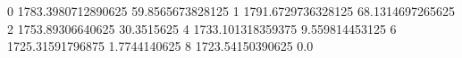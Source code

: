 0 1783.3980712890625 59.8565673828125
1 1791.6729736328125 68.1314697265625
2 1753.89306640625 30.3515625
4 1733.101318359375 9.559814453125
6 1725.31591796875 1.7744140625
8 1723.54150390625 0.0
